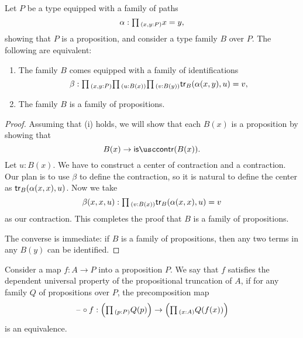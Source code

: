 \begin{lem}\label{lem:case-paths-induction-principle-propositional-truncation}
  Let $P$ be a type equipped with a family of paths
  \begin{equation*}
    \alpha : \prd{x,y:P}x=y,
  \end{equation*}
  showing that $P$ is a proposition, and consider a type family $B$ over $P$. The following are equivalent:
  \begin{enumerate}
  \item The family $B$ comes equipped with a family of identifications
    \begin{equation*}
      \beta:\prd{x,y:P}{u:B(x)}{v:B(y)}\tr_B(\alpha(x,y),u)=v,
    \end{equation*}
  \item The family $B$ is a family of propositions.
  \end{enumerate}
\end{lem}

\begin{proof}
  Assuming that (i) holds, we will show that each $B(x)$ is a proposition by showing that
  \begin{equation*}
    B(x)\to\iscontr(B(x)).
  \end{equation*}
  Let $u:B(x)$. We have to construct a center of contraction and a contraction. Our plan is to use $\beta$ to define the contraction, so it is natural to define the center as $\mathsf{tr}_B(\alpha(x,x),u)$. Now we take
  \begin{equation*}
    \beta(x,x,u):\prd{v:B(x)}\tr_B(\alpha(x,x),u)=v
  \end{equation*}
  as our contraction. This completes the proof that $B$ is a family of propositions.

  The converse is immediate: if $B$ is a family of propositions, then any two terms in any $B(y)$ can be identified.
\end{proof}

\begin{defn}
  Consider a map $f:A\to P$ into a proposition $P$. We say that $f$ satisfies the dependent universal property of the propositional truncation of $A$, if for any family $Q$ of propositions over $P$, the precomposition map
  \begin{equation*}
    \blank\circ f : \Big(\prd{p:P}Q(p)\Big)\to\Big(\prd{x:A}Q(f(x))\Big)
  \end{equation*}
  is an equivalence.
\end{defn}


